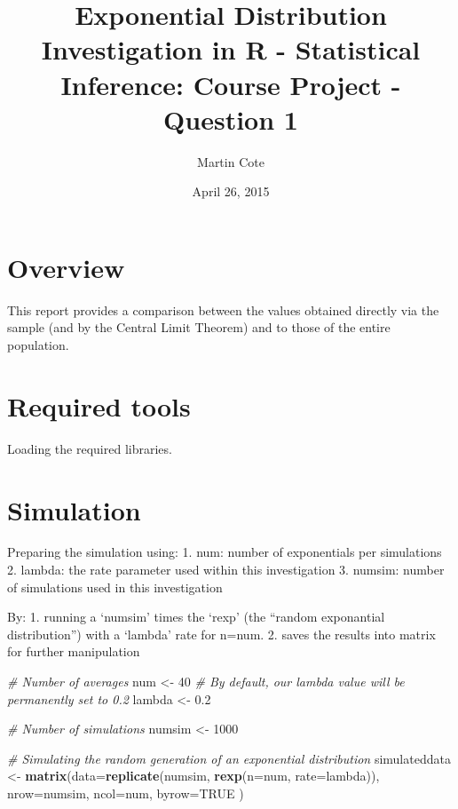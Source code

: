 \documentclass[]{article}
\title{Exponential Distribution Investigation in R - Statistical Inference:
Course Project - Question 1}
\author{Martin Cote}
\date{April 26, 2015}
\newenvironment{Shaded}{\begin{snugshade}}{\end{snugshade}}
\newcommand{\KeywordTok}[1]{\textcolor[rgb]{0.13,0.29,0.53}{\textbf{{#1}}}}
\newcommand{\DataTypeTok}[1]{\textcolor[rgb]{0.13,0.29,0.53}{{#1}}}
\newcommand{\DecValTok}[1]{\textcolor[rgb]{0.00,0.00,0.81}{{#1}}}
\newcommand{\FloatTok}[1]{\textcolor[rgb]{0.00,0.00,0.81}{{#1}}}
\newcommand{\StringTok}[1]{\textcolor[rgb]{0.31,0.60,0.02}{{#1}}}
\newcommand{\CommentTok}[1]{\textcolor[rgb]{0.56,0.35,0.01}{\textit{{#1}}}}
\newcommand{\OtherTok}[1]{\textcolor[rgb]{0.56,0.35,0.01}{{#1}}}
\newcommand{\NormalTok}[1]{{#1}}
\begin{document}
\maketitle


\section{Overview}\label{overview}

This report provides a comparison between the values obtained directly
via the sample (and by the Central Limit Theorem) and to those of the
entire population.

\section{Required tools}\label{required-tools}

Loading the required libraries.

\section{Simulation}\label{simulation}

Preparing the simulation using: 1. num: number of exponentials per
simulations 2. lambda: the rate parameter used within this investigation
3. numsim: number of simulations used in this investigation

By: 1. running a `numsim' times the `rexp' (the ``random exponantial
distribution'') with a `lambda' rate for n=num. 2. saves the results
into matrix for further manipulation

\begin{Shaded}
\begin{Highlighting}[]
\CommentTok{# Number of averages}
\NormalTok{num <-}\StringTok{ }\DecValTok{40}
\CommentTok{# By default, our lambda value will be permanently set to 0.2}
\NormalTok{lambda <-}\StringTok{ }\FloatTok{0.2}

\CommentTok{# Number of simulations}
\NormalTok{numsim <-}\StringTok{ }\DecValTok{1000}

\CommentTok{# Simulating the random generation of an exponential distribution}
\NormalTok{simulateddata <-}\StringTok{ }\KeywordTok{matrix}\NormalTok{(}\DataTypeTok{data=}\KeywordTok{replicate}\NormalTok{(numsim, }\KeywordTok{rexp}\NormalTok{(}\DataTypeTok{n=}\NormalTok{num, }\DataTypeTok{rate=}\NormalTok{lambda)), }\DataTypeTok{nrow=}\NormalTok{numsim, }\DataTypeTok{ncol=}\NormalTok{num, }\DataTypeTok{byrow=}\OtherTok{TRUE} \NormalTok{)}
\end{Highlighting}
\end{Shaded}
\end{document}
